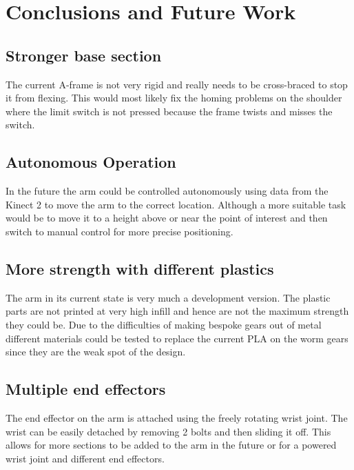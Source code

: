 \section{Conclusions and Future Work}

\subsection{Stronger base section}
The current A-frame is not very rigid and really needs to be cross-braced to stop it from flexing. This would most likely fix the homing problems on the shoulder where the limit switch is not pressed because the frame twists and misses the switch.

\subsection{Autonomous Operation}
In the future the arm could be controlled autonomously using data from the Kinect 2 to move the arm to the correct location. Although a more suitable task would be to move it to a height above or near the point of interest and then switch to manual control for more precise positioning.

\subsection{More strength with different plastics}
The arm in its current state is very much a development version. The plastic parts are not printed at very high infill and hence are not the maximum strength they could be. Due to the difficulties of making bespoke gears out of metal different materials could be tested to replace the current PLA on the worm gears since they are the weak spot of the design.

\subsection{Multiple end effectors}
The end effector on the arm is attached using the freely rotating wrist joint. The wrist can be easily detached by removing 2 bolts and then sliding it off. This allows for more sections to be added to the arm in the future or for a powered wrist joint and different end effectors.
  